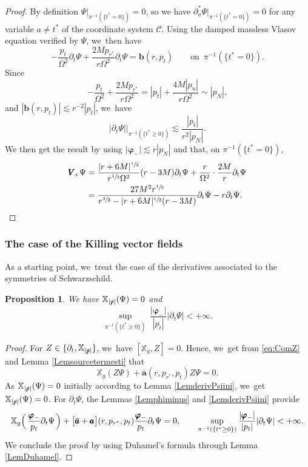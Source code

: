 \documentclass[JEP,XML,SOM,Unicode,published]{cedram}
\theoremstyle{plain}
\newtheorem{proposition}{Proposition}[section]
\theoremstyle{definition}
\newcommand\T{{\mathbb{X}}}
\begin{document}
\begin{proof}
By definition $\Psi \vert_{\pi^{-1}(\{t^*=0 \})}=0$, so we have $\partial^*_a\Psi \vert_{\pi^{-1}(\{t^*=0 \})}=0$ for any variable $a \neq t^*$ of the coordinate system $\mathscr{C}$. Using the damped massless Vlasov equation verified by $\Psi$, we~then have
\[
-\frac{p_t}{\Omega^2} \partial_t \Psi+\frac{2Mp_{r^*}}{r\Omega^2} \partial_t \Psi = \pmb{b}(r,p_t) \qquad \text{on $\,\pi^{-1}(\{t^*=0 \})$}.
\]
Since
\[
-\frac{p_t}{\Omega^2}+\frac{2Mp_{r^*}}{r\Omega^2} = |p_t|+\frac{4M|p_u|}{r\Omega^2} \sim |p_N|,
\]
and $|\pmb{b}(r,p_t)| \lesssim r^{-2} |p_t|$, we~have
\[
| \partial_t \Psi | \Big\vert_{\pi^{-1} (\{t^* \geq 0 \})} \lesssim \frac{|p_t|}{r^2|p_N|}.
\]
We then get the result by using $|\pmb{\varphi}_-| \lesssim r |p_N|$ and that, on $\pi^{-1}(\{t^*=0 \})$,
\begin{align*}
\pmb{V}_{\! +} \Psi &= \frac{|r+6M|^{\sfrac{1}{2}}}{r^{\sfrac{1}{2}}\Omega^2}(r-3M) \partial_t \Psi +\frac{r}{\Omega^2} \cdot \frac{2M}{r} \partial_t \Psi\\
&= \frac{27M^2r^{\sfrac{1}{2}} }{r^{\sfrac{3}{2}}-|r+6M|^{\sfrac{1}{2}}(r-3M)}\partial_t \Psi-r \partial_t \Psi.\qedhere
\end{align*}
\end{proof}

\subsubsection{The case of the Killing vector fields}

As a starting point, we~treat the case of the derivatives associated to the symmetries of Schwarzschild.

\begin{proposition}\label{ProPsiKilling}
We have $\T_{|\slashed{p}|} (\Psi)=0$ and
\[
\sup_{ \pi^{-1} (\{t^* \geq 0 \})} \, \frac{|\pmb{\varphi}_-|}{|p_t|} \big|\partial_t\Psi \big| < +\infty.
\]
\end{proposition}
\begin{proof}
For $Z \in \{\partial_t, \T_{|\slashed{p}|} \}$, we~have $[\T_g,Z]=0$. Hence, we~get from \eqref{eq:ComZ} and Lemma \ref{Lemsourcetermesti} that
\[
\T_g (Z \Psi)+ \overline{\pmb{a}}(r,p_{r^*},p_t) Z \Psi =0.
\]
As $\T_{|\slashed{p}|} (\Psi) =0$ initially according to Lemma \ref{LemderivPsiini}, we~get $\T_{|\slashed{p}|} (\Psi)=0$. For $\partial_t \Psi$, the Lemmas \ref{Lemphiminus} and \ref{LemderivPsiini} provide
\[
\T_g \Bigl(\, \frac{\pmb{\varphi}_-}{p_t} \partial_t \Psi \, \Bigr)+ \bigl[\overline{\pmb{a}}+\pmb{a} \bigr](r,p_{r^*},p_t) \frac{\pmb{\varphi}_-}{p_t} \partial_t \Psi =0,\qquad \sup_{\pi^{-1} (\{t^* \geq 0 \}) } \frac{|\pmb{\varphi}_-|}{|p_t|}| \partial_t \Psi | < + \infty.
\]
We conclude the proof by using Duhamel's formula through Lemma \ref{LemDuhamel}.
\end{proof}
\end{document}

